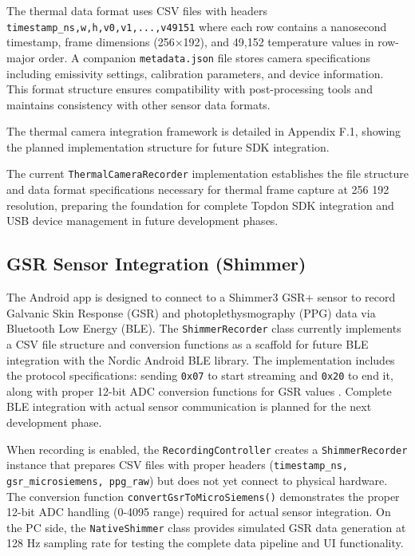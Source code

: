 The thermal data format uses CSV files with headers \texttt{timestamp\_ns,w,h,v0,v1,...,v49151} where each row contains a nanosecond timestamp, frame dimensions (256×192), and 49{,}152 temperature values in row-major order. A companion \texttt{metadata.json} file stores camera specifications including emissivity settings, calibration parameters, and device information. This format structure ensures compatibility with post-processing tools and maintains consistency with other sensor data formats.

The thermal camera integration framework is detailed in Appendix F.1, showing the planned implementation structure for future SDK integration.

The current \texttt{ThermalCameraRecorder} implementation establishes the file structure and data format specifications necessary for thermal frame capture at 256\,\texttimes\,192 resolution, preparing the foundation for complete Topdon SDK integration and USB device management in future development phases.

\subsection{GSR Sensor Integration (Shimmer)}\label{sec:4-2-2}
The Android app is designed to connect to a Shimmer3 GSR+ sensor to record Galvanic Skin Response (GSR) and photoplethysmography (PPG) data via Bluetooth Low Energy (BLE). The \texttt{ShimmerRecorder} class currently implements a CSV file structure and conversion functions as a scaffold for future BLE integration with the Nordic Android BLE library. The implementation includes the protocol specifications: sending \texttt{0x07} to start streaming and \texttt{0x20} to end it, along with proper 12-bit ADC conversion functions for GSR values \cite{ref15}. Complete BLE integration with actual sensor communication is planned for the next development phase.

When recording is enabled, the \texttt{RecordingController} creates a \texttt{ShimmerRecorder} instance that prepares CSV files with proper headers (\texttt{timestamp\_ns, gsr\_microsiemens, ppg\_raw}) but does not yet connect to physical hardware. The conversion function \texttt{convertGsrToMicroSiemens()} demonstrates the proper 12-bit ADC handling (0-4095 range) required for actual sensor integration. On the PC side, the \texttt{NativeShimmer} class provides simulated GSR data generation at 128 Hz sampling rate for testing the complete data pipeline and UI functionality.

